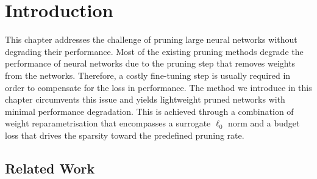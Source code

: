 \section{Introduction}

This chapter addresses the challenge of pruning large neural networks without
degrading their performance. Most of the existing pruning methods degrade the
performance of neural networks due to the pruning step that removes weights from
the networks. Therefore, a costly fine-tuning step is usually required in order
to compensate for the loss in performance. The method we introduce in this
chapter circumvents this issue and yields lightweight pruned networks with
minimal performance degradation. This is achieved through a combination of
weight reparametrisation that encompasses a surrogate $\ell_0$ norm and a budget
loss that drives the sparsity toward the predefined pruning rate.



\subsection{Related Work}

